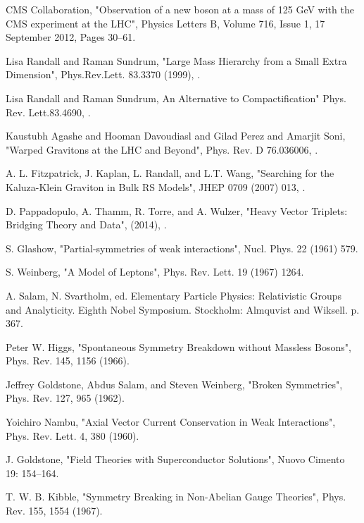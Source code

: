 \documentclass[a4paper,12pt,oneside]{report}
\begin{document}
\begin{thebibliography}{9}

CMS Collaboration,
"Observation of a new boson at a mass of 125 GeV with the CMS experiment at the LHC", 
Physics Letters B, Volume 716, Issue 1, 17 September 2012, Pages 30–61.

Lisa Randall and Raman Sundrum,
"Large Mass Hierarchy from a Small Extra Dimension",
Phys.Rev.Lett. 83.3370 (1999),
.

Lisa Randall and Raman Sundrum,
An Alternative to Compactification"
Phys. Rev. Lett.83.4690,
.

Kaustubh Agashe and Hooman Davoudiasl and Gilad Perez and Amarjit Soni,
"Warped Gravitons at the LHC and Beyond",
Phys. Rev. D 76.036006,
.

A. L. Fitzpatrick, J. Kaplan, L. Randall, and L.T. Wang,
"Searching for the Kaluza-Klein Graviton in Bulk RS Models",
JHEP 0709 (2007) 013,
.

D. Pappadopulo, A. Thamm, R. Torre, and A. Wulzer, "Heavy Vector Triplets: Bridging Theory and Data", (2014),
.

S. Glashow,
"Partial-symmetries of weak interactions",
Nucl. Phys. 22 (1961) 579.

S. Weinberg,
"A Model of Leptons",
Phys. Rev. Lett. 19 (1967) 1264.

A. Salam,
N. Svartholm, ed. Elementary Particle Physics: Relativistic Groups and Analyticity. Eighth Nobel Symposium. Stockholm: Almquvist and Wiksell. p. 367.

Peter W. Higgs,
"Spontaneous Symmetry Breakdown without Massless Bosons",
Phys. Rev. 145, 1156  (1966).

Jeffrey Goldstone, Abdus Salam, and Steven Weinberg,
"Broken Symmetries",
Phys. Rev. 127, 965 (1962).

Yoichiro Nambu,
"Axial Vector Current Conservation in Weak Interactions",
Phys. Rev. Lett. 4, 380 (1960).

J. Goldstone,
"Field Theories with Superconductor Solutions",
Nuovo Cimento 19: 154–164.

T. W. B. Kibble,
"Symmetry Breaking in Non-Abelian Gauge Theories",
Phys. Rev. 155, 1554 (1967).


\end{thebibliography}
\end{document}
